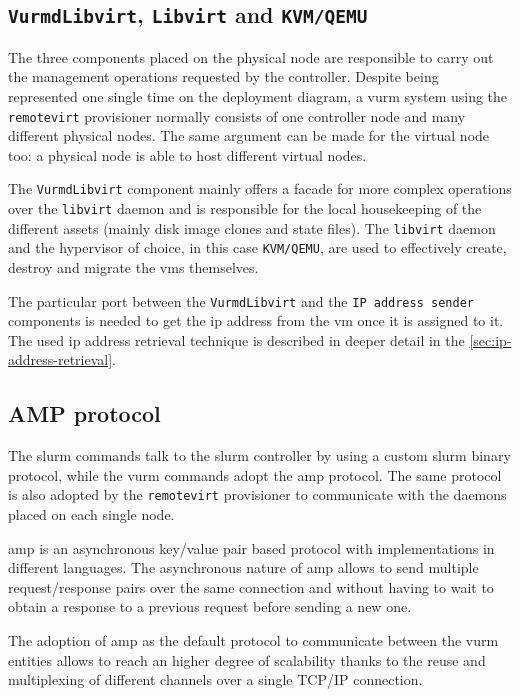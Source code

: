 \subsection*{\texttt{VurmdLibvirt}, \texttt{Libvirt} and \texttt{KVM/QEMU}}

The three components placed on the physical node are responsible to carry out the management operations requested by the controller. Despite being represented one single time on the deployment diagram, a \gls{vurm} system using the \texttt{remotevirt} provisioner normally consists of one controller node and many different physical nodes. The same argument can be made for the virtual node too: a physical node is able to host different virtual nodes.

The \texttt{VurmdLibvirt} component mainly offers a facade for more complex operations over the \texttt{libvirt} daemon and is responsible for the local housekeeping of the different assets (mainly disk image clones and state files). The \texttt{libvirt} daemon and the hypervisor of choice, in this case \texttt{KVM/QEMU}, are used to effectively create, destroy and migrate the \glspl{vm} themselves.

The particular port between the \texttt{VurmdLibvirt} and the \texttt{IP address sender} components is needed to get the \gls{ip} address from the \gls{vm} once it is assigned to it. The used \gls{ip} address retrieval technique is described in deeper detail in the \autoref{sec:ip-address-retrieval}.

\subsection*{AMP protocol}

The \gls{slurm} commands talk to the \gls{slurm} controller by using a custom \gls{slurm} binary protocol, while the \gls{vurm} commands adopt the \gls{amp} protocol. The same protocol is also adopted by the \texttt{remotevirt} provisioner to communicate with the daemons placed on each single node.

\gls{amp} \cite{amp-www} is an asynchronous key/value pair based protocol with implementations in different languages. The asynchronous nature of \gls{amp} allows to send multiple request/response pairs over the same connection and without having to wait to obtain a response to a previous request before sending a new one.

The adoption of \gls{amp} as the default protocol to communicate between the \gls{vurm} entities allows to reach an higher degree of scalability thanks to the reuse and multiplexing of different channels over a single TCP/IP connection.

